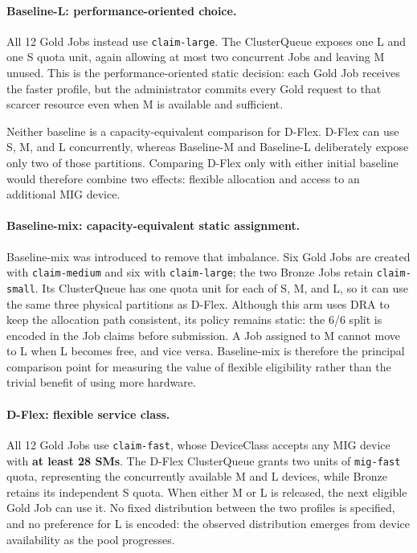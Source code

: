 \paragraph{Baseline-L: performance-oriented choice.}
All 12 Gold Jobs instead use \texttt{claim-large}. The ClusterQueue exposes one L and one S quota unit, again allowing at most two concurrent Jobs and leaving M unused. This is the performance-oriented static decision: each Gold Job receives the faster profile, but the administrator commits every Gold request to that scarcer resource even when M is available and sufficient.

Neither baseline is a capacity-equivalent comparison for D-Flex. D-Flex can use S, M, and L concurrently, whereas Baseline-M and Baseline-L deliberately expose only two of those partitions. Comparing D-Flex only with either initial baseline would therefore combine two effects: flexible allocation and access to an additional MIG device.

\paragraph{Baseline-mix: capacity-equivalent static assignment.}
Baseline-mix was introduced to remove that imbalance. Six Gold Jobs are created with \texttt{claim-medium} and six with \texttt{claim-large}; the two Bronze Jobs retain \texttt{claim-small}. Its ClusterQueue has one quota unit for each of S, M, and L, so it can use the same three physical partitions as D-Flex. Although this arm uses DRA to keep the allocation path consistent, its policy remains static: the 6/6 split is encoded in the Job claims before submission. A Job assigned to M cannot move to L when L becomes free, and vice versa. Baseline-mix is therefore the principal comparison point for measuring the value of flexible eligibility rather than the trivial benefit of using more hardware.

\paragraph{D-Flex: flexible service class.}
All 12 Gold Jobs use \texttt{claim-fast}, whose DeviceClass accepts any MIG device with \textbf{at least 28 SMs}. The D-Flex ClusterQueue grants two units of \texttt{mig-fast} quota, representing the concurrently available M and L devices, while Bronze retains its independent S quota. When either M or L is released, the next eligible Gold Job can use it. No fixed distribution between the two profiles is specified, and no preference for L is encoded: the observed distribution emerges from device availability as the pool progresses.

